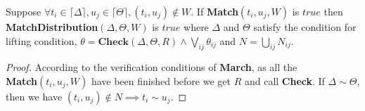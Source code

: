 \documentclass[a4paper,UKenglish,cleveref, autoref]{lipics-v2019}
\begin{document}
\begin{proposition}
Suppose $\forall t_i\in\lceil\Delta\rceil,u_j\in\lceil\Theta\rceil , (t_i,u_j)\notin W$.
If \textbf{Match}$(t_i,u_j,W)$ is $true$ then \textbf{MatchDistribution}$(\Delta,\Theta,W)$ is $true$ where $\Delta$ and $\Theta$ satisfy the condition for lifting condition, $\theta=\textbf{Check}(\Delta,\Theta,\textit{R})\wedge\bigvee_{ij}\theta_{ij}$  and $N=\bigcup_{ij}N_{ij}$.
\end{proposition}
\begin{proof}
According to the verification conditions of \textbf{March}, as all the \\\textbf{Match}$(t_i,u_j,W)$ have been finished before we get $R$ and call \textbf{Check}. If $\Delta\sim \Theta$, then we have $(t_i,u_j)\notin N\implies t_i\sim u_j$.
\end{proof}
\end{document}
